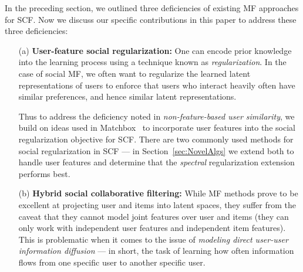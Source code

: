 \documentclass{sig-alternate}
\begin{document}
In the preceding section, we outlined three deficiencies of existing MF
approaches for SCF.  Now we discuss our specific
contributions in this paper to address these three deficiencies:
\begin{enumerate}
\item[(a)] {\bf User-feature social regularization:} One can encode
prior knowledge into the learning process using a technique known as
\emph{regularization}.  In the case of social MF, we often want to
regularize the learned latent representations of users to enforce that
users who interact heavily often have similar preferences, and hence
similar latent representations.  

Thus to address the deficiency noted in
\emph{non-feature-based user similarity}, we build on ideas used in
Matchbox~\cite{matchbox} to incorporate user features into the social
regularization objective for SCF.  There are two commonly used methods
for social regularization in SCF --- in Section~\ref{sec:NovelAlgs} we
extend both to handle user features and determine that the
\emph{spectral} regularization extension performs best.
\item[(b)] {\bf Hybrid social collaborative filtering:} While MF
methods prove to be excellent at projecting user and items into latent
spaces, they suffer from the caveat that they cannot model joint
features over user and items (they can only work with independent user
features and independent item features).  This is problematic when it
comes to the issue of \emph{modeling direct user-user information
diffusion} --- in short, the task of learning how often information
flows from one specific user to another specific user.  


\end{enumerate}
\end{document}
